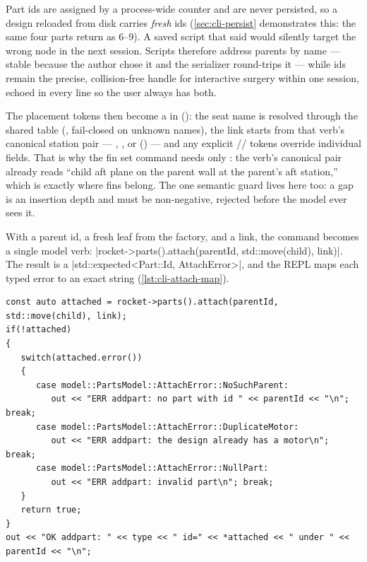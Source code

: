 \begin{designrule}
Part ids are assigned by a process-wide counter and are never persisted, so a design reloaded from
disk carries \emph{fresh} ids (\cref{sec:cli-persist} demonstrates this: the same four parts return
as 6--9). A saved script that said  would silently target the wrong node in
the next session. Scripts therefore address parents by name --- stable because the author chose it
and the serializer round-trips it --- while ids remain the precise, collision-free handle for
interactive surgery within one session, echoed in every  line so the user always has
both.
\end{designrule}

The placement tokens then become a  in 
(): the seat name is resolved through the shared
 table (, fail-closed on unknown
names), the link starts from that verb's canonical station pair --- ,
, or  () --- and any
explicit // tokens override individual fields.
That is why the fin set command needs only : the verb's canonical pair
already reads ``child aft plane on the parent wall at the parent's aft station,'' which is exactly
where fins belong. The one semantic guard lives here too: a  gap is an insertion
depth and must be non-negative, rejected before the model ever sees it.

With a parent id, a fresh leaf from the factory, and a link, the command becomes a single model
verb: \cppinline|rocket->parts().attach(parentId, std::move(child), link)|. The result is a
\cppinline|std::expected<Part::Id, AttachError>|, and the REPL maps each typed error to an exact
 string (\cref{lst:cli-attach-map}).

\begin{listing}[htbp]
\begin{verbatim}
const auto attached = rocket->parts().attach(parentId, std::move(child), link);
if(!attached)
{
   switch(attached.error())
   {
      case model::PartsModel::AttachError::NoSuchParent:
         out << "ERR addpart: no part with id " << parentId << "\n"; break;
      case model::PartsModel::AttachError::DuplicateMotor:
         out << "ERR addpart: the design already has a motor\n"; break;
      case model::PartsModel::AttachError::NullPart:
         out << "ERR addpart: invalid part\n"; break;
   }
   return true;
}
out << "OK addpart: " << type << " id=" << *attached << " under " << parentId << "\n";
\end{verbatim}
\caption{Typed error mapping in  (). The switch covers
 exhaustively with no default, so a new failure mode added to the model cannot
be silently dropped by the CLI --- the build warns until this mapping learns the new
arm.}\label{lst:cli-attach-map}
\end{listing}

